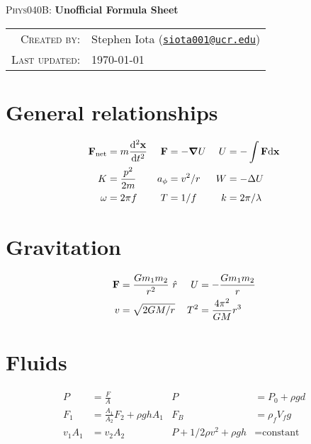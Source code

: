 \documentclass[10pt]{article}
\newcommand{\email}[1]{\texttt{\href{mailto:#1}{#1}}}
\begin{document}
\begin{center}

\Large{\textsc{Phys040B}: \textbf{Unofficial Formula Sheet}}
\end{center}
\vspace{.5mm}



\begin{tabular}{rl}
\textsc{Created by}:
&
Stephen Iota (\email{siota001@ucr.edu})
\\
\textsc{Last updated}:
&
\today
\end{tabular}


\section{General relationships}

\begin{align*}
\vb{F}_{\text{net}} &= m\dv[2]{\vb{x}}{t}
&
\vb{F} &= -\grad{U}
&
U &= -\int \vb{F} \text{d}\vb{x}
\\
K &= \frac{p^2}{2m}
&
a_\phi &= v^2/r
&
W &= -\Delta U
\\
\omega &= 2\pi f
&
T &= 1/f
&
k &= 2\pi/\lambda
\end{align*}



\section{Gravitation}

\begin{align*}
\vb{F} &= \frac{Gm_1m_2}{r^2} \ \hat{r}
&
U &= -\frac{Gm_1m_2}{r}
\\
v &= \sqrt{2GM/r}
&
T^2 &= \frac{4\pi^2}{GM}r^3
\\
\end{align*}




\section{Fluids}


\begin{align*}
P &= \frac{F}{A}
&
P &= P_0 + \rho gd
\\
F_1 &= \frac{A_1}{A_2} F_2 + \rho ghA_1
&
F_B &= \rho_f V_fg
\\
v_1A_1 &= v_2A_2
&
P + 1/2\rho v^2 + \rho gh &= \text{constant}
\end{align*}
\end{document}
